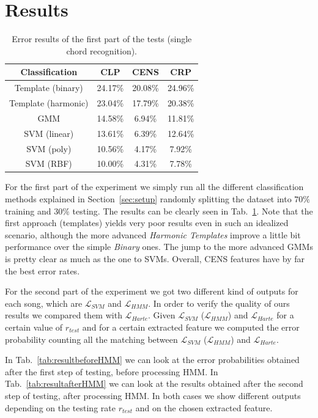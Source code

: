 \section{Results}
\label{sec:results}

\begin{table}[t]
	\centering
	\begin{tabular}{|c|ccc|}
		\hline
		Classification & CLP & CENS & CRP \\
		\hline
		Template (binary) & 24.17\% & 20.08\% & 24.96\% \\
		Template (harmonic) & 23.04\% & 17.79\% & 20.38\% \\
		GMM & 14.58\% & 6.94\% & 11.81\% \\
		\hline
		SVM (linear) & 13.61\% & 6.39\% & 12.64\% \\
		SVM (poly) & 10.56\% & 4.17\% & 7.92\% \\
		SVM (RBF) & 10.00\% & 4.31\% & 7.78\% \\
		\hline
	\end{tabular}
	\caption{Error results of the first part of the tests (single chord recognition).}
	\label{tab:singleChordResults}
\end{table}

For the first part of the experiment we simply run all the different classification methods explained in Section~\ref{sec:setup} randomly splitting the dataset into $70\%$ training and $30\%$ testing. The results can be clearly seen in Tab.~\ref{tab:singleChordResults}. Note that the first approach (templates) yields very poor results even in such an idealized scenario, although the more advanced \textit{Harmonic Templates} improve a little bit performance over the simple \textit{Binary} ones. The jump to the more advanced GMMs is pretty clear as much as the one to SVMs. Overall, CENS features have by far the best error rates.

For the second part of the experiment we got two different kind of outputs for each song, which are $\mathcal{L}_{SVM}$ and $\mathcal{L}_{HMM}$. In order to verify the quality of ours results we compared them with  $\mathcal{L}_{Harte}$. Given $\mathcal{L}_{SVM}$ ($\mathcal{L}_{HMM}$) and $\mathcal{L}_{Harte}$ for a certain value of $r_{test}$ and for a certain extracted feature we computed the error probability counting all the matching between $\mathcal{L}_{SVM}$ ($\mathcal{L}_{HMM}$) and $\mathcal{L}_{Harte}$.

 In Tab.~\ref{tab:resultbeforeHMM} we can look at the error probabilities obtained after the first step of testing, before processing HMM. In Tab.~\ref{tab:resultafterHMM} we can look at the results obtained after the second step of testing, after processing HMM. In both cases we show different outputs depending on the testing rate $r_{test}$ and on the chosen extracted feature.

